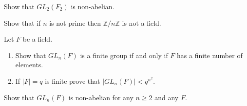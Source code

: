 \documentclass[
    11pt,a4paper,
]{exam}
\begin{document}
\begin{questions}
    \question
    Show that \(G L_2\left(F_2\right)\) is non-abelian.
    
    \question
    Show that if \(n\) is not prime then \(\mathbb{Z} / n \mathbb{Z}\) is not a field.
    
    \question
    Let \(F\) be a field.
    \begin{enumerate}[label=(\roman*)]
        \item Show that \(G L_n(F)\) is a finite group if and only if \(F\) has a finite number of elements.
        \item If \(|F|=q\) is finite prove that \(\left|G L_n(F)\right|<q^{n^2}\).
    \end{enumerate}
    
     
    
    \question
    Show that \(G L_n(F)\) is non-abelian for any \(n \geq 2\) and any \(F\).
    
    
    
    

\end{questions}
\end{document}
